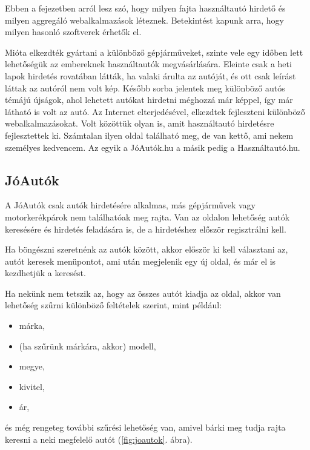 
Ebben a fejezetben arról lesz szó, hogy milyen fajta használtautó hirdető és milyen aggregáló webalkalmazások léteznek. Betekintést kapunk arra, hogy milyen hasonló szoftverek érhetők el.


Mióta elkezdték gyártani a különböző gépjárműveket, szinte vele egy időben lett lehetőségük az embereknek használtautók megvásárlására. Eleinte csak a heti lapok hirdetés rovatában látták, ha valaki árulta az autóját, és ott csak leírást láttak az autóról nem volt kép. Később sorba jelentek meg különböző autós témájú újságok, ahol lehetett autókat hirdetni méghozzá már képpel, így már látható is volt az autó. 
Az Internet elterjedésével, elkezdtek fejleszteni különböző webalkalmazásokat. Volt közöttük olyan is, amit használtautó hirdetésre fejlesztettek ki. Számtalan ilyen oldal található meg, de van kettő, ami nekem személyes kedvencem. Az egyik a JóAutók.hu a másik pedig a Használtautó.hu.

\subsection{JóAutók}
A JóAutók \cite{JoAuto} csak autók hirdetésére alkalmas, más gépjárművek vagy motorkerékpárok nem találhatóak meg rajta. Van az oldalon lehetőség autók keresésére és hirdetés feladására is, de a hirdetéshez először regisztrálni kell.

Ha böngészni szeretnénk az autók között, akkor először ki kell választani az, autót keresek menüpontot, ami után megjelenik egy új oldal, és már el is kezdhetjük a keresést.

Ha nekünk nem tetszik az, hogy az összes autót kiadja az oldal, akkor van lehetőség szűrni különböző feltételek szerint, mint például:
\begin{itemize}
\item márka,
\item (ha szűrünk márkára, akkor) modell,
\item megye,
\item kivitel,
\item ár,
\end{itemize}

és még rengeteg további szűrési lehetőség van, amivel bárki meg tudja rajta keresni a neki megfelelő autót (\ref{fig:joautok}. ábra).

